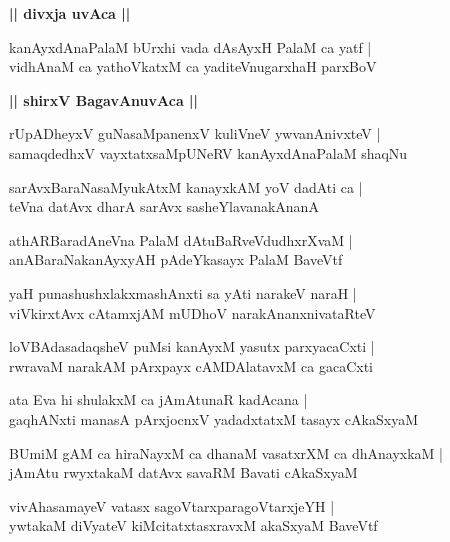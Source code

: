 \documentclass[twoside,12pt,openright]{book}
\newcounter{shloka}[chapter]
\def\uvaca#1{\centerline{{\large\textbf{#1}}}}
\begin{document}
\uvaca{|| divxja uvAca ||}

\begin{shloka}%
kanAyxdAnaPalaM bUrxhi vada dAsAyxH PalaM ca yatf |\\
vidhAnaM ca yathoVkatxM ca yaditeVnugarxhaH parxBoV
\end{shloka}

\uvaca{|| shirxV BagavAnuvAca ||}

\begin{shloka}%
rUpADheyxV guNasaMpanenxV kuliVneV ywvanAnivxteV |\\
samaqdedhxV vayxtatxsaMpUNeRV kanAyxdAnaPalaM shaqNu
\end{shloka}

\begin{shloka}%
sarAvxBaraNasaMyukAtxM kanayxkAM yoV dadAti ca |\\
teVna datAvx dharA sarAvx sasheYlavanakAnanA 
\end{shloka}

\begin{shloka}%
athARBaradAneVna PalaM dAtuBaRveVdudhxrXvaM |\\
anABaraNakanAyxyAH pAdeYkasayx PalaM  BaveVtf
\end{shloka}

\begin{shloka}%
yaH punashushxlakxmashAnxti sa yAti narakeV naraH |\\
viVkirxtAvx cAtamxjAM mUDhoV narakAnanxnivataRteV 
\end{shloka}

\begin{shloka}%
loVBAdasadaqsheV puMsi kanAyxM yasutx parxyacaCxti |\\
rwravaM narakAM pArxpayx cAMDAlatavxM ca gacaCxti 
\end{shloka}

\begin{shloka}%
ata Eva hi shulakxM ca jAmAtunaR kadAcana |\\
gaqhANxti manasA pArxjocnxV yadadxtatxM tasayx cAkaSxyaM 
\end{shloka}

\begin{shloka}%
BUmiM gAM ca hiraNayxM ca dhanaM vasatxrXM ca dhAnayxkaM |\\
jAmAtu rwyxtakaM datAvx savaRM Bavati cAkaSxyaM 
\end{shloka}

\begin{shloka}%
vivAhasamayeV vatasx sagoVtarxparagoVtarxjeYH |\\
ywtakaM diVyateV kiMcitatxtasxravxM akaSxyaM BaveVtf
\end{shloka}
\end{document}
